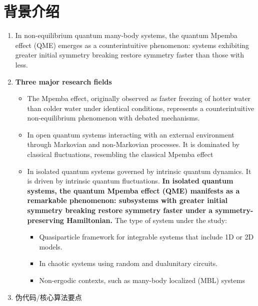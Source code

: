 \documentclass[11pt,a4paper]{article}
\begin{document}
\section{背景介绍}
\begin{enumerate}[leftmargin=*]
    \item In non-equilibrium quantum many-body systems, the quantum Mpemba effect (QME) emerges as a counterintuitive phenomenon: systems exhibiting greater initial symmetry breaking restore symmetry faster than those with less.
    \item \textbf{Three major research fields}
        \begin{itemize}
        \item The Mpemba effect, originally observed as faster freezing of hotter water than colder water under identical conditions, represents a counterintuitive non-equilibrium phenomenon with debated mechanisms.
        \item In open quantum systems interacting with an external environment through Markovian and non-Markovian processes. It is dominated by classical fluctuations, resembling the classical Mpemba effect
        \item In isolated quantum systems governed by intrinsic quantum dynamics. It is driven by intrinsic quantum fluctuations. \textbf{In isolated quantum systems, the quantum Mpemba effect (QME) manifests as a remarkable phenomenon: subsystems with greater initial symmetry breaking restore symmetry faster under a symmetry-preserving Hamiltonian.} The type of system under the study:
        \begin{itemize}
            \item Quasiparticle framework for integrable systems that include 1D or 2D models.
            \item In chaotic systems using random and dualunitary circuits.
            \item Non-ergodic contexts, such as many-body localized (MBL) systems
            \end{itemize}
        \end{itemize}
    \item 伪代码/核心算法要点
\end{enumerate}
\end{document}
